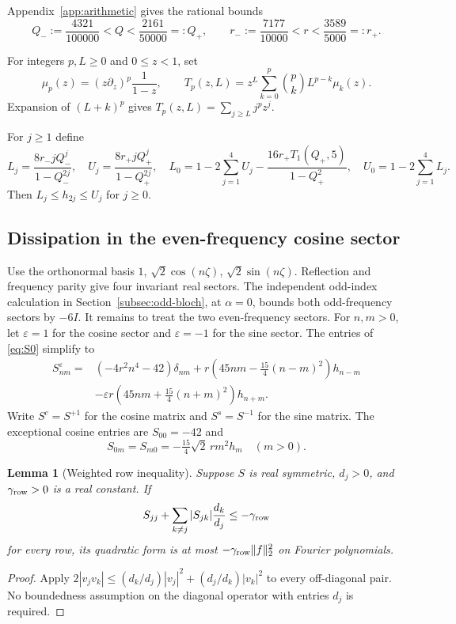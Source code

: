 \documentclass[a4paper,11pt]{article}
\numberwithin{equation}{section}
\newtheorem{lemma}[theorem]{Lemma}
\theoremstyle{definition}
\theoremstyle{remark}
\newcommand{\norm}[1]{\lVert#1\rVert}
\begin{document}
Appendix~\ref{app:arithmetic} gives the rational bounds
\begin{equation}\label{eq:endpoints}
 Q_-:=\frac{4321}{100000}<Q<\frac{2161}{50000}=:Q_+,
 \qquad r_-:=\frac{7177}{10000}<r<\frac{3589}{5000}=:r_+.
\end{equation}


For integers $p,L\ge0$ and $0\le z<1$, set
\begin{equation}\label{eq:moments}
 \mu_p(z)=(z\partial_z)^p\frac1{1-z},\qquad
 T_p(z,L)=z^L\sum_{k=0}^p\binom pk L^{p-k}\mu_k(z).
\end{equation}
Expansion of $(L+k)^p$ gives $T_p(z,L)=\sum_{j\ge L}j^pz^j$.

For $j\ge1$ define
\begin{equation}\label{eq:L-U}
 L_j=\frac{8r_-jQ_-^j}{1-Q_-^{2j}},\quad
 U_j=\frac{8r_+jQ_+^j}{1-Q_+^{2j}},\quad
 L_0=1-2\sum_{j=1}^4U_j-\frac{16r_+T_1(Q_+,5)}{1-Q_+^2},\quad
 U_0=1-2\sum_{j=1}^4L_j.
\end{equation}
Then $L_j\le h_{2j}\le U_j$ for $j\ge0$.

\subsection{Dissipation in the even-frequency cosine sector}
Use the orthonormal basis $1$, $\sqrt2\cos(n\zeta)$, $\sqrt2\sin(n\zeta)$. Reflection and frequency parity give four invariant real sectors. The independent odd-index calculation in Section~\ref{subsec:odd-bloch}, at $\alpha=0$, bounds both odd-frequency sectors by $-6I$. It remains to treat the two even-frequency sectors. For $n,m>0$, let $\varepsilon=1$ for the cosine sector and $\varepsilon=-1$ for the sine sector. The entries of \eqref{eq:S0} simplify to
\begin{align}
 S^\varepsilon_{nm}={}&(-4r^2n^4-42)\delta_{nm}
 +r\left(45nm-\tfrac{15}{4}(n-m)^2\right)h_{n-m}\nonumber\\
 &-\varepsilon r\left(45nm+\tfrac{15}{4}(n+m)^2\right)h_{n+m}.\label{eq:entries}
\end{align}
Write $S^c=S^{+1}$ for the cosine matrix and $S^s=S^{-1}$ for the sine matrix. The exceptional cosine entries are $S_{00}=-42$ and
\begin{equation}\label{eq:zero}
 S_{0m}=S_{m0}=-\tfrac{15}{4}\sqrt2\,r m^2h_m\quad(m>0).
\end{equation}


\begin{lemma}[Weighted row inequality]\label{lem:row}
Suppose $S$ is real symmetric, $d_j>0$, and $\gamma_{\rm row}>0$ is a real constant. If
\[
 S_{jj}+\sum_{k\ne j}|S_{jk}|\frac{d_k}{d_j}\le-\gamma_{\rm row}
\]
for every row, its quadratic form is at most $-\gamma_{\rm row}\norm f_2^2$ on Fourier polynomials.
\end{lemma}
\begin{proof}
Apply $2|v_jv_k|\le(d_k/d_j)|v_j|^2+(d_j/d_k)|v_k|^2$ to every off-diagonal pair. No boundedness assumption on the diagonal operator with entries $d_j$ is required.
\end{proof}
\end{document}
